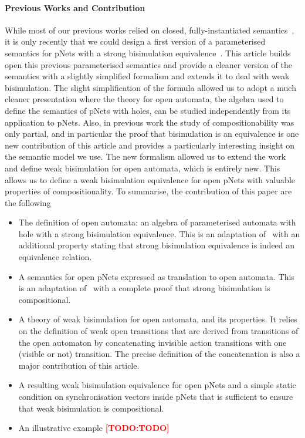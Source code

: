 \documentclass{lmcs}
\newcommand{\TODO}[1]{\textcolor{red}{\textbf{[TODO:#1]}}}
\begin{document}
\paragraph{Previous Works and Contribution}
While most of our previous works relied on closed, fully-instantiated semantics~\cite{BBCHM:article2008,AmeurBoulifa2017,henrio:hal-01303557}, it is only recently that we could design a first version of a  parameterised semantics for pNets with a strong bisimulation equivalence~\cite{henrio:Forte2016}. This article builds open this previous parameterised semantics and provide a cleaner version of the semantics with a slightly simplified formalism and extends it to deal with weak bisimulation. The slight simplification of the formula allowed us to adopt a much cleaner presentation where the theory for open automata, the algebra used to define the semantics of pNets with holes, can be studied independently from its application to pNets. Also, in previous work the study of compositionability was only partial, and in particular the proof that bisimulation is an equivalence is one new contribution of this article and provides a particularly interesting insight on the semantic model we use.
The new formalism allowed us to extend the work and define weak bisimulation  for open automata, which is entirely new. This allows us to define a weak bisimulation equivalence for open pNets with valuable properties of compositionality. 
To summarise, the contribution of this paper are the following
\begin{itemize}
\item The definition of open automata: an algebra of parameterised automata with hole with a strong bisimulation equivalence. This is an adaptation of~\cite{henrio:Forte2016} with an additional property stating that strong bisimulation equivalence is indeed an equivalence relation.
\item A semantics for open pNets expressed as translation to open automata. This is an adaptation of~\cite{henrio:Forte2016} with a complete proof that strong bisimulation is compositional.
\item A theory of weak bisimulation for open automata, and its properties. It relies on the definition of weak open transitions that are derived from transitions of the open automaton by concatenating invisible action transitions with one (visible or not) transition. The precise definition of the concatenation is also a major contribution of this article.
\item A resulting weak bisimulation equivalence for open pNets and a simple static condition on synchronisation vectors inside pNets that is sufficient to ensure that weak bisimulation is compositional.
\item An illustrative example \TODO{TODO}
\end{itemize}
\end{document}

